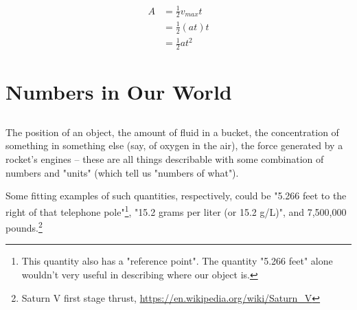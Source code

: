 \documentclass{article}
\begin{document}
\begin{align*}
A &= \frac{1}{2} v_{max} t \\
&= \frac{1}{2} (a t) t \\
&= \frac{1}{2} a t^2
\end{align*}




















\section{Numbers in Our World}

\subsection{}

The position of an object, the amount of fluid in a bucket, the concentration of something in something else (say, of oxygen in the air), the force generated by a rocket's engines -- these are all things describable with some combination of numbers and "units" (which tell us "numbers of what"). 


Some fitting examples of such quantities, respectively, could be "5.266 feet to the right of that telephone pole"\footnote{This quantity also has a "reference point". The quantity "5.266 feet" alone wouldn't very useful in describing where our object is.}, "15.2 grams per liter (or 15.2 g/L)", and 7,500,000 pounds.\footnote{Saturn V first stage thrust, \url{https://en.wikipedia.org/wiki/Saturn_V}}

\end{document}

